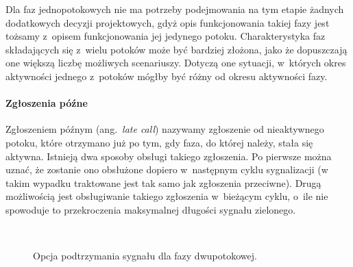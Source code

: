 \documentclass{pracamgr}
\newcommand{\ang}[1]{(ang.~\emph{#1})}
\theoremstyle{plain}
\begin{document}
Dla faz jednopotokowych nie ma potrzeby podejmowania na tym etapie
żadnych dodatkowych decyzji projektowych, gdyż opis funkcjonowania
takiej fazy jest tożsamy z~opisem funkcjonowania jej jedynego
potoku. Charakterystyka faz składających się z~wielu potoków może być
bardziej złożona, jako że dopuszczają one większą liczbę możliwych
scenariuszy. Dotyczą one sytuacji, w~których okres aktywności jednego
z~potoków mógłby być różny od okresu aktywności fazy.

\paragraph{Zgłoszenia późne} Zgłoszeniem późnym \ang{late call} nazywamy zgłoszenie od
nieaktywnego potoku, które otrzymano już po tym, gdy faza, do której
należy, stała się aktywna. Istnieją dwa sposoby obsługi takiego
zgłoszenia. Po pierwsze można uznać, że zostanie ono obsłużone dopiero
w~następnym cyklu sygnalizacji (w takim wypadku traktowane jest tak
samo jak zgłoszenia przeciwne). Drugą możliwością jest obsługiwanie
takiego zgłoszenia w~bieżącym cyklu, o~ile nie spowoduje to
przekroczenia maksymalnej długości sygnału zielonego.
\begin{figure}
  \centering
  \\\vspace{0.5cm}
  \caption{Opcja podtrzymania sygnału dla fazy dwupotokowej.}
\end{figure}
\end{document}
